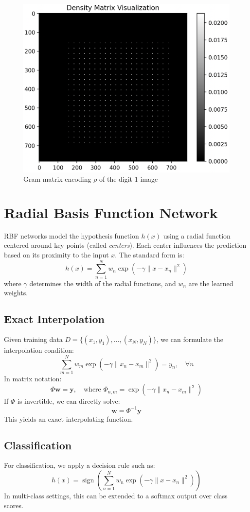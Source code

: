 \documentclass[twocolumn]{article} %
\begin{document}
\begin{figure}[h!]
    \centering
    \includegraphics[width=0.6\linewidth]{figures/density_matrix_nmist_one.png}
    \caption{Gram matrix encoding $\rho$ of the digit 1 image}
    \label{fig:density_matrix}
\end{figure}

\section{Radial Basis Function Network}

RBF networks model the hypothesis function $h(x)$ using a radial function centered around key points (called \emph{centers}). Each center influences the prediction based on its proximity to the input $x$. The standard form is:
\[
h(x) = \sum_{n=1}^N w_n\exp\left(-\gamma\| x - x_n \|^2\right)
\]
where $\gamma$ determines the width of the radial functions, and $w_n$ are the learned weights.

\subsection{Exact Interpolation}
Given training data $D = \{(x_1, y_1), \dots, (x_N, y_N)\}$, we can formulate the interpolation condition:
\[
\sum_{m=1}^N w_m\exp\left(-\gamma\| x_n - x_m \|^2\right) = y_n, \quad \forall n
\]
In matrix notation:
\[
\Phi \mathbf{w} = \mathbf{y}, \quad \text{where } \Phi_{n,m} = \exp\left(-\gamma\|x_n - x_m\|^2\right)
\]
If $\Phi$ is invertible, we can directly solve:
\[
\mathbf{w} = \Phi^{-1} \mathbf{y}
\]
This yields an exact interpolating function.

\subsection{Classification}
For classification, we apply a decision rule such as:
\[
h(x) = \operatorname{sign}\left(\sum_{n=1}^N w_n\exp(-\gamma\|x - x_n\|^2)\right)
\]
In multi-class settings, this can be extended to a softmax output over class scores.
\end{document}
